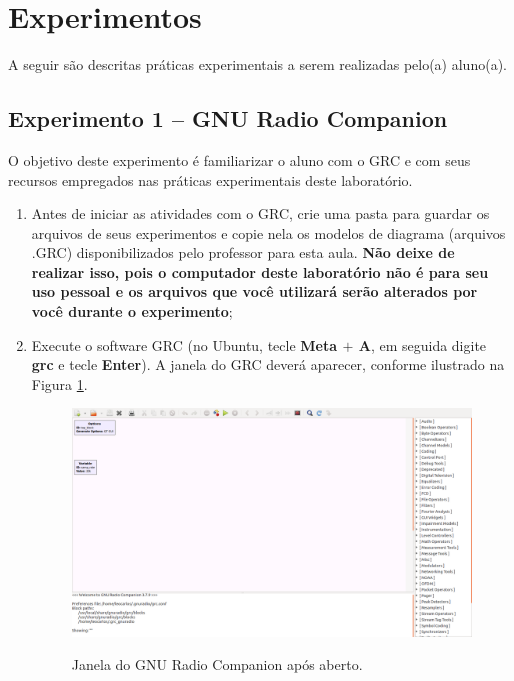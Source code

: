 \documentclass[12pt,addpoints]{exam}
\begin{document}
\section{Experimentos}

A seguir são descritas práticas experimentais a serem realizadas pelo(a) aluno(a). 

\subsection{Experimento 1 -- GNU Radio Companion}

O objetivo deste experimento é familiarizar o aluno com o GRC e com seus recursos empregados nas práticas experimentais deste laboratório.

\begin{enumerate}
    \item Antes de iniciar as atividades com o GRC, crie uma pasta para guardar os arquivos de seus experimentos e copie nela os modelos de diagrama (arquivos .GRC) disponibilizados pelo professor para esta aula. \textbf{Não deixe de realizar isso, pois o computador deste laboratório não é para seu uso pessoal e os arquivos que você utilizará serão alterados por você durante o experimento};
    \item Execute o software GRC (no Ubuntu, tecle \textbf{Meta $+$ A}, em seguida digite \textbf{grc} e tecle \textbf{Enter}). A janela do GRC deverá aparecer, conforme ilustrado na Figura \ref{fig:GRC_1-1a}.
    \begin{figure}[htb]
        \centering
        \includegraphics[width=\textwidth]{./Figuras/GRC_1-1a} \\
        \caption{Janela do GNU Radio Companion após aberto.} 
        \label{fig:GRC_1-1a}
    \end{figure}
  

\end{enumerate}
\end{document}
